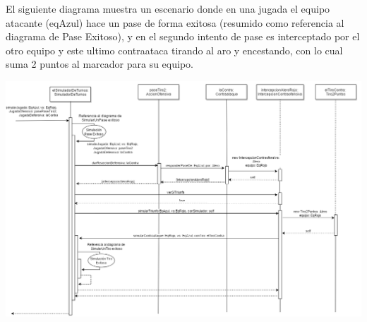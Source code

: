 El siguiente diagrama muestra un escenario donde en una jugada el equipo atacante (eqAzul) hace un pase de forma exitosa (resumido como referencia al diagrama de Pase Exitoso), y en el segundo intento de pase es interceptado por el otro equipo y este ultimo contraataca tirando al aro y encestando, con lo cual suma 2 puntos al marcador para su equipo.

\includegraphics[width=\textwidth]{imgs/ContraataqueSecuencia.png}


